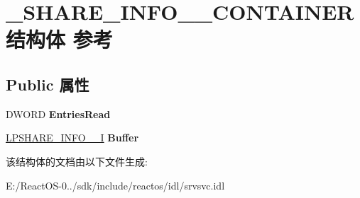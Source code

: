 \hypertarget{struct___s_h_a_r_e___i_n_f_o__503___c_o_n_t_a_i_n_e_r}{}\section{\+\_\+\+S\+H\+A\+R\+E\+\_\+\+I\+N\+F\+O\+\_\+\_\+\+C\+O\+N\+T\+A\+I\+N\+E\+R结构体 参考}
\label{struct___s_h_a_r_e___i_n_f_o__503___c_o_n_t_a_i_n_e_r}
\subsection*{Public 属性}
\begin{DoxyCompactItemize}
\item 
\mbox{\label{struct___s_h_a_r_e___i_n_f_o__503___c_o_n_t_a_i_n_e_r_a41344b2c544699c54028bb4b3656e818}} 
D\+W\+O\+RD {\bfseries Entries\+Read}
\item 
\mbox{\label{struct___s_h_a_r_e___i_n_f_o__503___c_o_n_t_a_i_n_e_r_abec219ec6433082b188609e918cb138d}} 
\hyperlink{struct___s_h_a_r_e___i_n_f_o__503___i}{L\+P\+S\+H\+A\+R\+E\+\_\+\+I\+N\+F\+O\+\_\+\_\+I} {\bfseries Buffer}
\end{DoxyCompactItemize}


该结构体的文档由以下文件生成\+:\begin{DoxyCompactItemize}
\item 
E\+:/\+React\+O\+S-\/0../sdk/include/reactos/idl/srvsvc.\+idl\end{DoxyCompactItemize}
